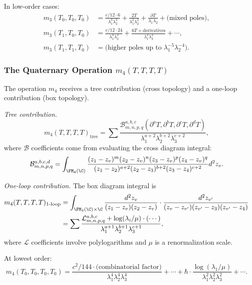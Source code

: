 In low-order cases:
\begin{align}
m_3(T_0, T_0, T_0) &= \frac{c/12 \cdot 6}{\lambda_1^3 \lambda_2^3} + \frac{2T}{\lambda_1^2 \lambda_2^2} + \frac{\partial T}{\lambda_1 \lambda_2} + \text{(mixed poles)},\\
m_3(T_1, T_0, T_0) &= \frac{c/12 \cdot 24}{\lambda_1^4 \lambda_2^3} + \frac{6T + \text{derivatives}}{\lambda_1^3 \lambda_2^2} + \cdots,\\
m_3(T_1, T_1, T_0) &= \text{(higher poles up to } \lambda_1^{-5} \lambda_2^{-4} \text{)}.
\end{align}

\subsubsection{The Quaternary Operation $m_4(T,T,T,T)$}

The operation $m_4$ receives a tree contribution (cross topology) and a
one-loop contribution (box topology).

\medskip
\noindent\emph{Tree contribution.}
\begin{equation}
\label{eq:vir-m4-tree}
m_4(T,T,T,T)_{\text{tree}} = \sum \frac{\mathcal{B}^{a,b,c}_{m,n,p,q}(\partial^a T, \partial^b T, \partial^c T, \partial^d T)}{\lambda_1^{a+2} \lambda_2^{b+2} \lambda_3^{c+2}},
\end{equation}
where $\mathcal{B}$ coefficients come from evaluating the cross diagram integral:
\begin{equation}
\mathcal{B}^{a,b,c,d}_{m,n,p,q} = \int_{\FM_4(\C)} \frac{(z_1-z_v)^m (z_2-z_v)^n (z_3-z_v)^p (z_4-z_v)^q}{(z_1-z_2)^{a+2} (z_2-z_3)^{b+2} (z_3-z_4)^{c+2}} d^2z_v.
\end{equation}

\medskip
\noindent\emph{One-loop contribution.}
The box diagram integral is
\begin{align}
m_4(T,T,T,T)_{1\text{-loop}} &= \int_{\FM_4(\C) \times \C} \frac{d^2z_v}{(z_1-z_v)(z_2-z_v)} \cdot \frac{d^2z_{v'}}{(z_v-z_{v'})(z_{v'}-z_3)(z_{v'}-z_4)}\\
&= \sum \frac{\mathcal{L}^{a,b,c}_{m,n,p,q} + \log(\lambda_i/\mu) \cdot (\cdots)}{\lambda_1^{a+1} \lambda_2^{b+1} \lambda_3^{c+1}},
\end{align}
where $\mathcal{L}$ coefficients involve polylogarithms and $\mu$ is a renormalization scale.

At lowest order:
\begin{equation}
m_4(T_0, T_0, T_0, T_0) = \frac{c^2/144 \cdot \text{(combinatorial factor)}}{\lambda_1^4 \lambda_2^4 \lambda_3^4} + \cdots + \hbar \cdot \frac{\log(\lambda_1/\mu)}{\lambda_1^2 \lambda_2^2 \lambda_3^2} + \cdots.
\end{equation}

